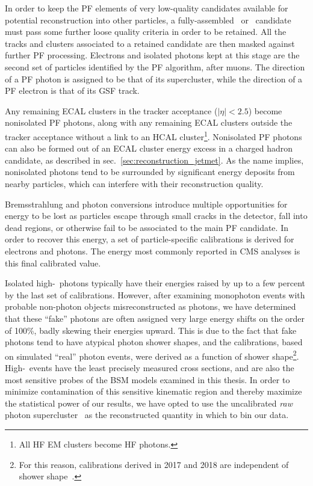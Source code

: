In order to keep the PF elements of very low-quality candidates available for potential reconstruction into other particles, a fully-assembled \Pe\ or \Pgamma\ candidate
must pass some further loose quality criteria in order to be retained. All the tracks and clusters associated to a retained candidate are then
masked against further PF processing. Electrons and isolated photons kept at this stage are the second set of particles identified by the PF algorithm, after muons.
The direction of a PF photon is assigned to be that of its supercluster, while the direction of a PF electron is that of its GSF track.

Any remaining ECAL clusters in the tracker acceptance ($|\eta| < 2.5$) become nonisolated PF photons, along with any remaining ECAL clusters outside the tracker
acceptance without a link to an HCAL cluster\footnote{All HF EM clusters become HF photons.}.
Nonisolated PF photons can also be formed out of an ECAL cluster energy excess in a charged hadron candidate, as described in sec.~\ref{sec:reconstruction_jetmet}.
As the name implies, nonisolated photons tend to be surrounded by significant energy deposits from nearby particles, which can interfere with their reconstruction quality.

Bremsstrahlung and photon conversions introduce multiple opportunities for energy to be lost as particles escape
through small cracks in the detector, fall into dead regions, or otherwise fail to be associated to the main PF candidate. In order to recover this energy,
a set of particle-specific calibrations is derived for electrons and photons. The energy most commonly reported in CMS analyses is this final calibrated value.

Isolated high-\pT\ photons typically have their energies raised by up to a few percent by the last set of calibrations. However, after examining monophoton events with
probable non-photon objects misreconstructed as photons, we have determined that these ``fake'' photons are often assigned very large energy shifts
on the order of 100\%, badly skewing their energies upward. This is due to the fact that fake photons tend to have atypical photon shower shapes,
and the calibrations, based on simulated ``real'' photon events, were derived as a function of shower shape\footnote{For this reason, calibrations
derived in 2017 and 2018 are independent of shower shape~\cite{ref:egammaclusterregression_2018}.}.
High-\pTgamma\ events have the least precisely measured cross sections, and are also the most sensitive probes of the BSM models examined in this thesis.
In order to minimize contamination of this sensitive kinematic region and thereby maximize the statistical power of our results,
we have opted to use the uncalibrated \textit{raw} photon supercluster \ET\ as the reconstructed quantity in which to bin our data.

